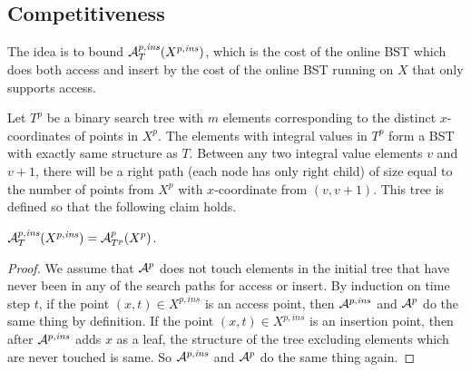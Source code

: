\subsection{Competitiveness}
The idea is to bound ${\mathcal{A}}^{p,\mathit{ins}}_T(X^{p,\mathit{ins}})$, which is the cost of the online BST 
which does both access and insert by the cost of the online BST running on $X$ that only supports access.

Let $T^p$ be a binary search tree with $m$ elements corresponding to the distinct $x$-coordinates of points in $X^p$.
The elements with integral values in $T^p$ form a BST with exactly same structure as $T$. 
Between any two integral value elements $v$ and $v+1$, there will be a right path (each node has only right child) of size 
equal to the number of points from $X^p$ with $x$-coordinate from $(v,v+1)$.
This tree is defined so that the following claim holds.
\begin{lemma}
	\label{lem:bounded by access-only}${\mathcal{A}}^{p,\mathit{ins}}_T(X^{p,\mathit{ins}}) = {\mathcal{A}}^{p}_{T^p}(X^p)$.\end{lemma}
\begin{proof}
	We assume that ${\mathcal{A}}^p$ does not touch elements in the initial tree 
	that have never been in any of the search paths for access or insert.
	By induction on time step $t$, if the point $(x,t)\in X^{p,\mathit{ins}}$ is an access point, then ${\mathcal{A}}^{p,\mathit{ins}}$ and ${\mathcal{A}}^{p}$ do the same thing by definition. 
	If the point $(x,t)\in X^{p,\mathit{ins}}$ is an insertion point, then after ${\mathcal{A}}^{p,\mathit{ins}}$ adds $x$ as a leaf, the structure of the tree excluding elements which are never touched is same. So  ${\mathcal{A}}^{p,\mathit{ins}}$ and ${\mathcal{A}}^{p}$ do the same thing again.
\end{proof}

